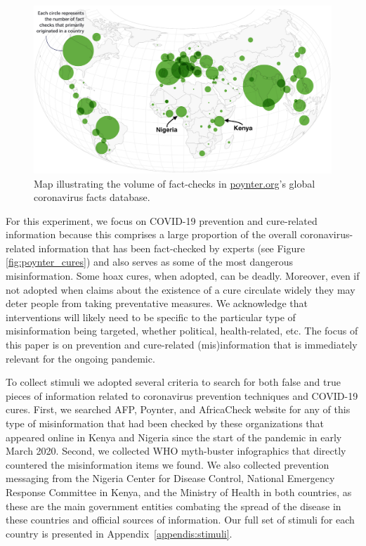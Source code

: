 \documentclass[letterpaper, 12pt, parskip=full,]{scrartcl}
\begin{document}
\begin{figure}[!htb]
\centering
\caption{Map illustrating the volume of fact-checks in \url{poynter.org}'s global coronavirus facts database.}
\label{fig:poynter}
\includegraphics[width=.95\textwidth]{poynter2.png}
\end{figure}

For this experiment, we focus on COVID-19 prevention and cure-related information because this comprises a large proportion of the overall coronavirus-related information that has been fact-checked by experts (see Figure \ref{fig:poynter_cures}) and also serves as some of the most dangerous misinformation. Some hoax cures, when adopted, can be deadly. Moreover, even if not adopted when claims about the existence of a cure circulate widely they may deter people from taking preventative measures. We acknowledge that interventions will likely need to be specific to the particular type of misinformation being targeted, whether political, health-related, etc. The focus of this paper is on prevention and cure-related (mis)information that is immediately relevant for the ongoing pandemic. 

To collect stimuli we adopted several criteria to search for both false and true pieces of information related to coronavirus prevention techniques and COVID-19 cures. First, we searched AFP, Poynter, and AfricaCheck website for any of this type of misinformation that had been checked by these organizations that appeared online in Kenya and Nigeria since the start of the pandemic in early March 2020. Second, we collected WHO myth-buster infographics that directly countered the misinformation items we found. We also collected prevention messaging from the Nigeria Center for Disease Control, National Emergency Response Committee in Kenya, and the Ministry of Health in both countries, as these are the main government entities combating the spread of the disease in these countries and official sources of information. Our full set of stimuli for each country is presented in Appendix~\ref{appendis:stimuli}. 
\end{document}
